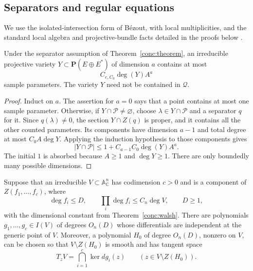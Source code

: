 

\subsection{Separators and regular equations}

We use the isolated-intersection form of B\'ezout, with local
multiplicities, and the standard local algebra and projective-bundle
facts detailed in the proofs below
\cite{fulton1998,hartshorne1977}.

\begin{lemma}
\label{conc:separators}
Under the separator assumption of Theorem~\ref{conc:theorem}, an
irreducible projective variety $Y\subset\mathbf P(E\oplus E^*)$ of
dimension $a$ contains at most
\[
 C_{e,C_0}\deg(Y)A^a
\]
sample parameters.  The variety $Y$ need not be contained in
$\mathcal Q$.
\end{lemma}

\begin{proof}
Induct on $a$.  The assertion for $a=0$ says that a point contains at
most one sample parameter.  Otherwise, if $Y\cap\mathcal P\ne\varnothing$,
choose $\lambda\in Y\cap\mathcal P$ and a separator $q$ for it.  Since
$q(\lambda)\ne0$, the section $Y\cap Z(q)$ is proper, and it contains
all the other counted parameters.  Its components have dimension
$a-1$ and total degree at most $C_0A\deg Y$.  Applying the induction
hypothesis to those components gives
\[
 |Y\cap\mathcal P|
 \leq 1+C_{a-1}C_0\deg(Y)A^a.
\]
The initial $1$ is absorbed because $A\geq1$ and $\deg Y\geq1$.
There are only boundedly many possible dimensions.
\end{proof}

\begin{lemma}
\label{conc:regularity}
Suppose that an irreducible $V\subset\mathbb A^n_{\mathbb C}$ has
codimension $c>0$ and is a component of $Z(f_1,\ldots,f_c)$, where
\[
 \deg f_i\leq D,\qquad
 \prod_i\deg f_i\leq C_n\deg V,\qquad D\geq1,
\]
with the dimensional constant from Theorem~\ref{conc:walsh}.
There are polynomials $g_1,\ldots,g_c\in I(V)$ of degrees $O_n(D)$
whose differentials are independent at the generic point of $V$.
Moreover, a polynomial $H_0$ of degree $O_n(D)$, nonzero on $V$, can be
chosen so that $V\setminus Z(H_0)$ is smooth and has tangent space
\[
 T_zV=\bigcap_{i=1}^c\ker dg_i(z)
 \qquad(z\in V\setminus Z(H_0)).
\]
\end{lemma}

